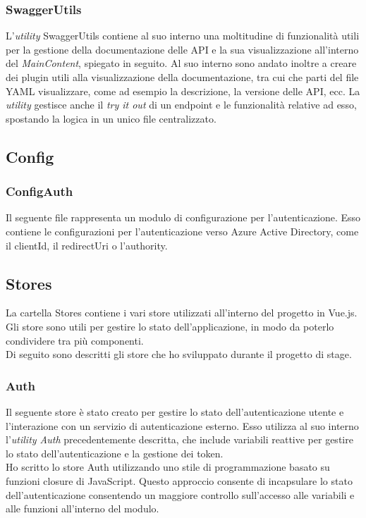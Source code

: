 \subsubsection{SwaggerUtils}\label{subsubsec:swagger-utils}
L'\textit{utility} SwaggerUtils contiene al suo interno una moltitudine di funzionalità utili per la gestione della documentazione delle API e la sua visualizzazione all'interno
del \textit{MainContent}, spiegato in seguito.
Al suo interno sono andato inoltre a creare dei plugin utili alla visualizzazione della documentazione, tra cui che parti del file YAML visualizzare, come ad esempio la descrizione, la versione delle API, ecc.
La \textit{utility} gestisce anche il \textit{try it out} di un endpoint e le funzionalità relative ad esso, spostando la logica in un unico file centralizzato.

\subsection{Config}\label{subsec:config}
\subsubsection{ConfigAuth}\label{subsubsec:config-auth}
Il seguente file rappresenta un modulo di configurazione per l'autenticazione. Esso contiene le configurazioni per l'autenticazione verso Azure Active Directory,
come il clientId, il redirectUri o l'authority.  

\subsection{Stores}\label{subsec:store}
La cartella Stores contiene i vari store utilizzati all'interno del progetto in Vue.js. Gli store sono utili per gestire lo stato dell'applicazione,
in modo da poterlo condividere tra più componenti.\\
Di seguito sono descritti gli store che ho sviluppato durante il progetto di stage.

\subsubsection{Auth}\label{subsubsec:auth-store}
Il seguente store è stato creato per gestire lo stato dell'autenticazione utente e l'interazione con un servizio di autenticazione esterno.
Esso utilizza al suo interno l'\textit{utility Auth} precedentemente descritta, che include variabili reattive per gestire lo stato dell'autenticazione e la gestione dei token.\\
Ho scritto lo store Auth utilizzando uno stile di programmazione basato su funzioni closure di JavaScript. Questo approccio consente di incapsulare
lo stato dell'autenticazione consentendo un maggiore controllo sull'accesso alle variabili e alle funzioni all'interno del modulo.

